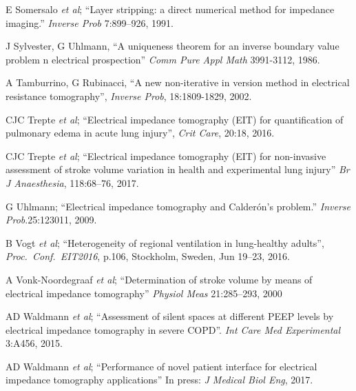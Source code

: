 \documentclass[12pt]{article} \usepackage[margin=3cm]{geometry} \usepackage[margin=20pt,font=small,labelfont=bf]{caption}\def\TBLWIDA{35mm}\def\TBLWIDB{95mm}
\newcommand{\ifmaxthree}[2]{#2 {\em et al}; }
\begin{document}
\begin{thebibliography}{00}
\ifmaxthree{
E Somersalo, M Cheney, D Isaacson, E Isaacson. 
}{
E Somersalo
}
``Layer stripping: a direct numerical method for impedance imaging.''
{\em Inverse Prob} 7:899--926, 1991.

J Sylvester, G Uhlmann,
``A uniqueness theorem for an inverse
boundary value problem n electrical prospection''
{\em Comm Pure Appl Math} 3991-3112, 1986.

A Tamburrino, G Rubinacci,
``A new non-iterative in version method in electrical resistance tomography'',
{\em Inverse Prob}, 18:1809-1829, 2002.

\ifmaxthree{
CJC Trepte, CR Phillips, J Solà, A Adler, SA Haas, M Rapin; SH Böhm, DA Reuter
}{
CJC Trepte
}
``Electrical impedance tomography (EIT) for quantification of pulmonary edema in acute lung injury'',
{\em Crit Care},  20:18, 2016.

\ifmaxthree{
CJC Trepte, C Phillips, J Solà, A Adler, B Saugel, S Haas, SH Böhm, DA Reuter
}{
CJC Trepte}
``Electrical impedance tomography (EIT) for non-invasive assessment of stroke volume variation in health and experimental lung injury''
{\em Br J Anaesthesia}, 118:68--76, 2017.

G Uhlmann;
``Electrical impedance tomography and Calderón's problem.''
{\em  Inverse Prob}.25:123011, 2009.

\ifmaxthree{
B Vogt, K Ehlers, V Hennig, Z Zhao, N Weiler, I Frerichs;
}{
B Vogt
}
``Heterogeneity of regional ventilation in lung-healthy adults'',
{\em Proc.~Conf.~EIT2016}, p.106, 
Stockholm, Sweden, Jun 19--23, 2016.

\ifmaxthree{
A Vonk-Noordegraaf, A Janse, JT Marcus, JGF Bronzwaer, PE Postmus, TJC Faes, PMJM de Vries,
}{
A Vonk-Noordegraaf
}
``Determination of stroke volume by means of electrical impedance tomography''
{\em Physiol Meas} 21:285--293, 2000 

\ifmaxthree{
AD Waldmann, PL Róka, SH Böhm, W Windisch, S Strassmann, C Karagiannidis.
}{
AD Waldmann
}
``Assessment of silent spaces at different PEEP levels by electrical impedance tomography in severe COPD''.
{\em Int Care Med Experimental} 3:A456, 2015.

\ifmaxthree{
AD Waldmann, KH Wodack, A März, A Ukere,
CJ Trepte, SH Böhm, DA Reuter
}{
AD Waldmann
}
``Performance of novel patient interface for electrical impedance
tomography applications''
In press: {\em J Medical Biol Eng}, 2017.


\end{thebibliography}
\end{document}
